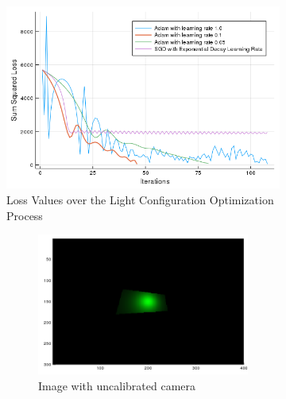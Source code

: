 \documentclass{juliacon}
\begin{document}
\begin{figure}[!htb]
    \centering
    \begin{subfigure}[c]{0.45\textwidth}
        \includegraphics[width=\linewidth]{images/camera/loss_plot.png}
        \caption{Loss Values over the Light Configuration Optimization Process}
        \label{fig:cam_curve}
    \end{subfigure}
    \hfill
    \begin{subfigure}[c]{0.45\textwidth}
        \begin{subfigure}[c]{0.45\textwidth}
            \centering
            \includegraphics[width=\textwidth]{images/camera/initial_guess_image.png}
            \caption{Image with uncalibrated camera}
            \label{fig:cam_guess}
        \end{subfigure}
        \hfill
        \begin{subfigure}[c]{0.45\textwidth}

\end{subfigure}
\end{subfigure}
\end{figure}
\end{document}
